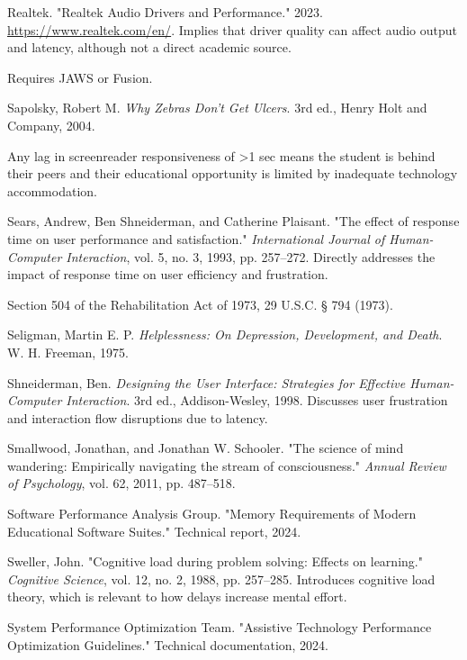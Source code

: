 \begin{thebibliography}{99}
Realtek. "Realtek Audio Drivers and Performance." 2023. \url{https://www.realtek.com/en/}. Implies that driver quality can affect audio output and latency, although not a direct academic source.

Requires JAWS or Fusion.

Sapolsky, Robert M. \emph{Why Zebras Don't Get Ulcers}. 3rd ed., Henry Holt and Company, 2004.

Any lag in screenreader responsiveness of >1 sec means the student is behind their peers and their educational opportunity is limited by inadequate technology accommodation.

Sears, Andrew, Ben Shneiderman, and Catherine Plaisant. "The effect of response time on user performance and satisfaction." \emph{International Journal of Human-Computer Interaction}, vol. 5, no. 3, 1993, pp. 257--272. Directly addresses the impact of response time on user efficiency and frustration.

Section 504 of the Rehabilitation Act of 1973, 29 U.S.C. § 794 (1973).

Seligman, Martin E. P. \emph{Helplessness: On Depression, Development, and Death}. W. H. Freeman, 1975.

Shneiderman, Ben. \emph{Designing the User Interface: Strategies for Effective Human-Computer Interaction}. 3rd ed., Addison-Wesley, 1998. Discusses user frustration and interaction flow disruptions due to latency.

Smallwood, Jonathan, and Jonathan W. Schooler. "The science of mind wandering: Empirically navigating the stream of consciousness." \emph{Annual Review of Psychology}, vol. 62, 2011, pp. 487--518.

Software Performance Analysis Group. "Memory Requirements of Modern Educational Software Suites." Technical report, 2024.

Sweller, John. "Cognitive load during problem solving: Effects on learning." \emph{Cognitive Science}, vol. 12, no. 2, 1988, pp. 257--285. Introduces cognitive load theory, which is relevant to how delays increase mental effort.

System Performance Optimization Team. "Assistive Technology Performance Optimization Guidelines." Technical documentation, 2024.


\end{thebibliography}
